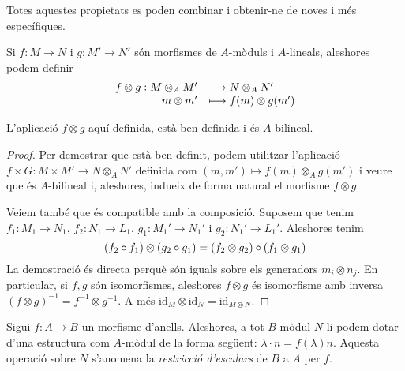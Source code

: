 \documentclass[../../../main.tex]{subfiles}
\begin{document}
Totes aquestes propietats es poden combinar i obtenir-ne de noves i més específiques.

\begin{defi}
\label{def:aplicacioProducteTensorial} Si $f:M\to N$ i $g:M'\to N'$ són morfismes de $A$-mòduls i $A$-lineals, aleshores podem definir
\begin{equation}
    \notag
    \begin{array}{rl}
        f\otimes g:M\otimes_AM' & \longrightarrow N\otimes_AN' \\
        m\otimes m' & \longmapsto f(m)\otimes g(m')
    \end{array}
\end{equation}
\end{defi}

\begin{prop}
L'aplicació $f\otimes g$ aquí definida, està ben definida i és $A$-bilineal.
\end{prop}
\begin{proof}
Per demostrar que està ben definit, podem utilitzar l'aplicació $f\times G:M\times M'\to N\otimes_AN'$ definida com $(m,m')\mapsto f(m)\otimes_Ag(m')$ i veure que és $A$-bilineal i, aleshores, indueix de forma natural el morfisme $f\otimes g$.

Veiem també que és compatible amb la composició. Suposem que tenim $f_1:M_1\to N_1$, $f_2:N_1\to L_1$, $g_1:M_1'\to N_1'$ i $g_2:N_1'\to L_1'$. Aleshores tenim
\begin{equation}
    \notag
    (f_2\circ f_1)\otimes (g_2\circ g_1) = (f_2\otimes g_2)\circ (f_1\otimes g_1)
\end{equation}
La demostració és directa perquè són iguals sobre els generadors $m_i\otimes n_j$. En particular, si $f,g$ són isomorfismes, aleshores $f\otimes g$ és isomorfisme amb inversa $(f\otimes g)^{-1} = f^{-1}\otimes g^{-1}$. A més $\mathrm{id}_M\otimes \mathrm{id}_N = \mathrm{id}_{M\otimes N}$.
\end{proof}



\begin{defi}
\label{def:restriccioDescalars} Sigui $f:A\to B$ un morfisme d'anells. Aleshores, a tot $B$-mòdul $N$ li podem dotar d'una estructura com $A$-mòdul de la forma següent: $\lambda\cdotp n = f(\lambda)n$. Aquesta operació sobre $N$ s'anomena la \textit{restricció d'escalars} de $B$ a $A$ per $f$.
\end{defi}
\end{document}
